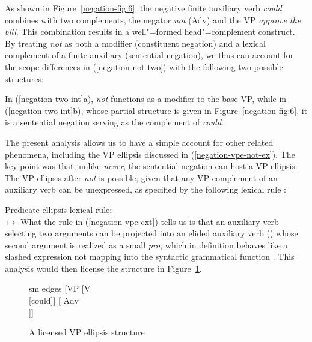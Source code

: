 \documentclass[output=paper
	        ,collection
	        ,collectionchapter
 	        ,biblatex
                ,babelshorthands
                ,newtxmath
                ,draftmode
                ,colorlinks, citecolor=brown
]{langscibook}
\begin{document}
{\begin{exe}
\begin{xlist}
\begin{exe}
\begin{xlist}
As shown in Figure~\ref{negation-fig:6}, the negative finite auxiliary
verb \textit{could} combines with two complements, the negator
\textit{not} (Adv) and the VP \textit{approve the bill}.
This combination results in a well"=formed head"=complement construct.
By treating \textit{not} as both a modifier (constituent negation)
and a lexical complement of a finite auxiliary (sentential negation), we thus can
account for the scope differences in (\ref{negation-not-two}) with the
following two possible structures:

\eal
\label{negation-two-int}
\zl
%
In (\ref{negation-two-int}a), \textit{not} functions as a modifier to
the base VP, while  in (\ref{negation-two-int}b), whose partial structure is
given in Figure~\ref{negation-fig:6}, it is a sentential
negation serving as the complement of \emph{could}.

The present analysis allows us to have a simple account for other related phenomena,
including the VP ellipsis discussed in (\ref{negation-vpe-not-ex}). The key point
was that, unlike \textit{never}, the sentential negation can
host a VP ellipsis.  The VP ellipsis after \textit{not} is
possible, given that any VP complement of an auxiliary
verb can be unexpressed, as
specified by the following lexical rule \parencites{Kim:00}[]{kimmichaelis:2020}:


\ea
\label{negation-vpe-cxt}
Predicate ellipsis lexical rule:\\
  $\mapsto$
\z
%
%
What the rule in (\ref{negation-vpe-cxt}) tells us is that an auxiliary verb selecting two arguments
can be projected into an elided auxiliary verb () whose second argument
is realized as a small \emph{pro}, which in definition
behaves like a slashed expression not mapping into the syntactic grammatical
 function \COMPS. This analysis would then license
the structure in Figure~\ref{negation-could-not}.
%
%
%
%
\begin{figure}
	\begin{forest}
		sm edges
		[VP
			[V\\
					[could]]
			[ Adv\\
					[not]]]
	\end{forest}
\caption{A licensed VP ellipsis structure}\label{negation-could-not}
\end{figure}


\end{xlist}
\end{exe}
\end{xlist}
\end{exe}}
\end{document}
